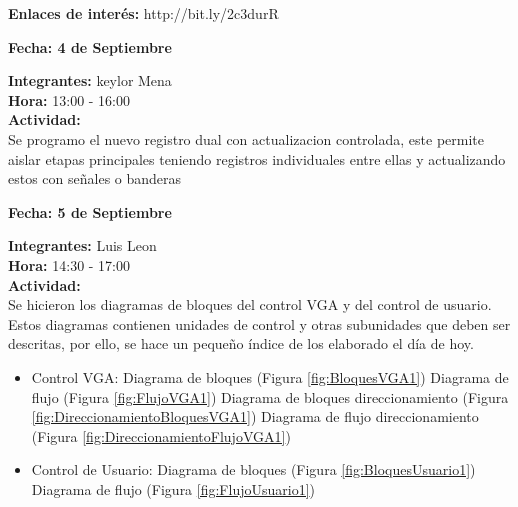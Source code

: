 \documentclass[12pt,a4paper]{report}
\begin{document}
\noindent \textbf{Enlaces de interés:} 
http://bit.ly/2c3durR

\newpage
\begin{flushright}
	\begin{large}
		\textbf{Fecha: 4 de Septiembre}\\[5ex]
	\end{large}
\end{flushright}

\noindent \textbf{Integrantes:} keylor Mena \\[1ex]
\textbf{Hora:} 13:00 - 16:00 \\[1ex]
\textbf{Actividad:} \\[2ex]

Se programo el nuevo registro dual con actualizacion controlada, este permite aislar etapas principales teniendo registros individuales entre ellas y actualizando estos con señales o banderas


\newpage
\begin{flushright}
	\begin{large}
		\textbf{Fecha: 5 de Septiembre}\\[5ex]
	\end{large}
\end{flushright}

\noindent \textbf{Integrantes:} Luis Leon \\[1ex]
\textbf{Hora:} 14:30 - 17:00 \\[1ex]
\textbf{Actividad:} \\[2ex]

Se hicieron los diagramas de bloques del control VGA y del control de usuario. Estos diagramas contienen unidades de control y otras subunidades que deben ser descritas, por ello, se hace un pequeño índice de los elaborado el día de hoy. \\

\begin{itemize}
	\item Control VGA: 
		\subitem Diagrama de bloques (Figura \ref{fig:BloquesVGA1}) 
		\subitem Diagrama de flujo (Figura \ref{fig:FlujoVGA1})
		\subitem Diagrama de bloques direccionamiento (Figura \ref{fig:DireccionamientoBloquesVGA1})
		\subitem Diagrama de flujo direccionamiento (Figura \ref{fig:DireccionamientoFlujoVGA1})
	\item Control de Usuario:
		\subitem Diagrama de bloques (Figura \ref{fig:BloquesUsuario1})
		\subitem Diagrama de flujo (Figura \ref{fig:FlujoUsuario1})
\end{itemize}
\end{document}
